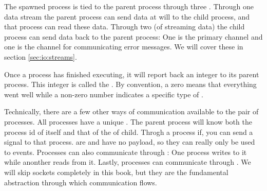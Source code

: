 The spawned process is tied to the parent process through three . Through one data stream the parent process can send data at will to the child process, and that process can read these data. Through two  (of streaming data) the child process can send data back to the parent process: One is the primary channel and one is the channel for communicating error messages. We will cover these in section \ref{sec:io:streams}.

Once a process has finished executing, it will report back an integer to its parent process. This integer is called the . By convention, a zero means that everything went well while a non-zero number indicates a specific type of .

Technically, there are a few other ways of communication available to the pair of processes. All processes have a unique . The parent process will know both the process id of itself and that of the of child. Throgh a process if, you can send a signal to that process.  are  and have no payload, so they can really only be used to  events. Processes can also communicate through : One process writes to it while anonther reads from it. Lastly, processes can communicate through . We will skip sockets completely in this book, but they are the fundamental abstraction through which  communication flows.

